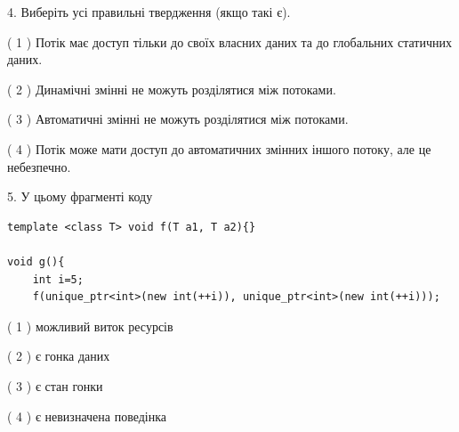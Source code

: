 \documentclass[12pt, ukrainian]{article}
\begin{document}
\begin {large}
{%
4. Виберіть усі правильні твердження (якщо такі є).\par
\vspace{2mm}

( 1 ) Потік має доступ тільки до своїх власних даних та до глобальних статичних даних.%

( 2 ) Динамічні змінні не можуть розділятися між потоками.%

( 3 ) Автоматичні змінні не можуть розділятися між потоками.%

( 4 ) Потік може мати доступ до автоматичних змінних іншого потоку, але це небезпечно.%


5. У цьому фрагменті коду
\begin{verbatim}
template <class T> void f(T a1, T a2){}

void g(){
    int i=5;
    f(unique_ptr<int>(new int(++i)), unique_ptr<int>(new int(++i)));
\end{verbatim}

( 1 ) можливий виток ресурсів%

( 2 ) є гонка даних%

( 3 ) є стан гонки%

( 4 ) є невизначена поведінка%
}
\end {large}
\end{document}
